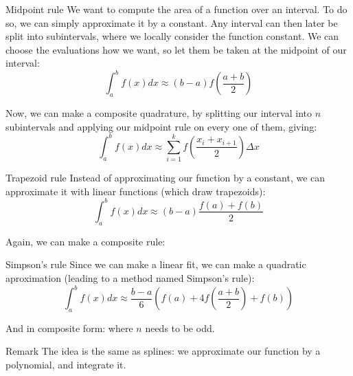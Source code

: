 \documentclass[a4paper]{article}
\begin{document}
\begin{parag}{Midpoint rule}
    We want to compute the area of a function over an interval. To do so, we can simply approximate it by a constant. Any interval can then later be split into subintervals, where we locally consider the function constant. We can choose the evaluations how we want, so let them be taken at the midpoint of our interval:
    \[\int_{a}^{b} f\left(x\right)dx \approx \left(b-a\right)f\left(\frac{a+b}{2}\right)\]
    
    Now, we can make a composite quadrature, by splitting our interval into $n$ subintervals and applying our midpoint rule on every one of them, giving: 
    \[\int_{a}^{b} f\left(x\right)dx \approx \sum_{i=1}^{k} f\left(\frac{x_i + x_{i+1}}{2}\right)\Delta x\]
    
\end{parag}

\begin{parag}{Trapezoid rule}
    Instead of approximating our function by a constant, we can approximate it with linear functions (which draw trapezoids):
    \[\int_{a}^{b} f\left(x\right)dx \approx \left(b-a\right)\frac{f\left(a\right)+ f\left(b\right)}{2}\]

    Again, we can make a composite rule:

\end{parag}

\begin{parag}{Simpson's rule}
    Since we can make a linear fit, we can make a quadratic aproximation (leading to a method named Simpson's rule): 
    \[\int_{a}^{b} f\left(x\right)dx \approx \frac{b-a}{6}\left(f\left(a\right) + 4f\left(\frac{a+b}{2}\right) + f\left(b\right)\right)\]
    
    And in composite form:
    where $n$ needs to be odd.


    \begin{subparag}{Remark}
        The idea is the same as splines: we approximate our function by a polynomial, and integrate it.
    \end{subparag}
    
\end{parag}
\end{document}
